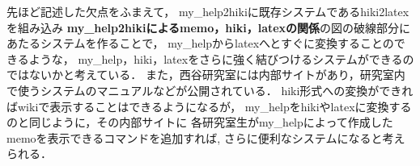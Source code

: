 先ほど記述した欠点をふまえて，
my\_help2hikiに既存システムであるhiki2latexを組み込み
\textbf{my\_help2hikiによるmemo，hiki，latexの関係}の図の破線部分にあたるシステムを作ることで，
my\_helpからlatexへとすぐに変換することのできるような，
my\_help，hiki，latexをさらに強く結びつけるシステムができるのではないかと考えている．
また，西谷研究室には内部サイトがあり，研究室内で使うシステムのマニュアルなどが公開されている．
hiki形式への変換ができればwikiで表示することはできるようになるが，
my\_helpをhikiやlatexに変換するのと同じように，その内部サイトに
各研究室生がmy\_helpによって作成したmemoを表示できるコマンドを追加すれば,
さらに便利なシステムになると考えられる．

